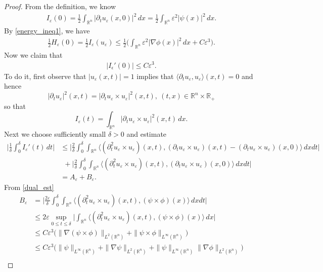 \documentclass[10pt,a4paper]{amsart}
\newcommand{\eps}{\varepsilon}
\begin{document}
\begin{proof} From the definition, we know
\begin{align}\label{I-est}
I_\eps(0)=\frac12\int_{\mathbb{R}^n}|\partial_tu_\eps(x,0)|^2\,dx
=\frac12\int_{\mathbb{R}^n}\eps^2|\psi(x)|^2\,dx. 
\end{align}
By \eqref{energy_ineq1}, we have 
\begin{align}\label{H-est}
\frac12H_\eps(0)
=\frac12 I_\eps(u_\eps)
\le\frac12\big(\int_{\mathbb{R}^n}
\eps^2|\nabla\phi(x)|^2\,dx+C\eps^3\big).
\end{align}
Now we claim that
\begin{align}\label{I'-est}
 |I_\epsilon'(0)|
 \le C\eps^3.
\end{align}
To do it, first observe that 
$|u_\eps(x,t)|=1$ implies that
$\langle \partial_tu_\eps, u_\eps\rangle (x,t)=0$
and hence
\[
|\partial_tu_\eps|^2(x,t)
=|\partial_tu_\eps\times u_\eps|^2(x,t),
\ (t,x)\in \mathbb{R}^n\times \mathbb{R}_+
\]
so that
\[
I_\eps(t)=\int_{\mathbb{R}^n}
|\partial_tu_\eps\times u_\eps|^2(x,t)\,dx.
\]
Next we choose sufficiently small $\delta>0$ and estimate
\begin{align}\label{energy_est1}
\Big|\frac{1}{\delta}\int_0^\delta I_\eps'(t)\,dt\Big|
&\le \Big|\frac{2}{\delta}\int_0^\delta
\int_{\mathbb{R}^n}\langle (\partial_t^2u_\eps\times 
u_\eps)(x,t), (\partial_tu_\eps\times u_\eps)(x,t)-(\partial_tu_\eps\times u_\eps)(x,0)\rangle\,dxdt\Big|\nonumber\\
&\ \ +\Big|\frac{2}{\delta}\int_0^\delta
\int_{\mathbb{R}^n}\langle (\partial_t^2u_\eps\times u_\eps)(x,t), (\partial_tu_\eps\times u_\eps)(x,0)\rangle\,dxdt\Big|\nonumber\\
&=A_\eps+B_\eps.
\end{align}
From \eqref{dual_est} 
\begin{align*}
 B_\eps&=\Big|\frac{2\eps}{\delta}\int_0^\delta
\int_{\mathbb{R}^n}\langle (\partial_t^2u_\eps\times u_\eps)(x,t), (\psi\times \phi)(x)\rangle\,dxdt\Big|\\
 &\le  
2\eps\sup_{0\le t\le\delta}
\Big|\int_{\mathbb{R}^n}\langle (\partial_t^2u_\eps\times u_\eps)(x,t), (\psi\times \phi)(x)\rangle\,dx\Big|\\
&\le C\eps^3\big(\|\nabla(\psi\times\phi)\|_{L^2(\mathbb{R}^n)}
+\|\psi\times\phi\|_{L^\infty(\mathbb{R}^n)}\big)\\
&\le C\eps^3
\Big(\|\psi\|_{L^\infty(\mathbb{R}^n)}
+\|\nabla\psi\|_{L^2(\mathbb{R}^n)}
+\|\psi\|_{L^\infty(\mathbb{R}^n)}
\|\nabla\phi\|_{L^2(\mathbb{R}^n)}\Big)\\

\end{align*}
\end{proof}
\end{document}
